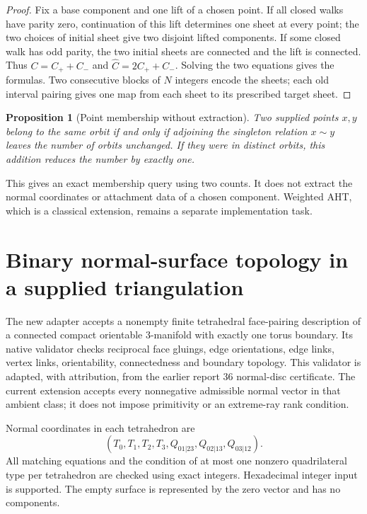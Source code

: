 \documentclass[11pt]{article}
\newtheorem{proposition}[theorem]{Proposition}
\theoremstyle{definition}
\begin{document}
\begin{proof}
Fix a base component and one lift of a chosen point. If all closed
walks have parity zero, continuation of this lift determines one sheet
at every point; the two choices of initial sheet give two disjoint lifted
components. If some closed walk has odd parity, the two initial sheets
are connected and the lift is connected. Thus
$C=C_++C_-$ and $\widehat C=2C_++C_-$. Solving the two equations gives
the formulas. Two consecutive blocks of $N$ integers encode the sheets;
each old interval pairing gives one map from each sheet to its prescribed
target sheet.
\end{proof}

\begin{proposition}[Point membership without extraction]
Two supplied points $x,y$ belong to the same orbit if and only if
adjoining the singleton relation $x\sim y$ leaves the number of orbits
unchanged. If they were in distinct orbits, this addition reduces the
number by exactly one.
\end{proposition}

This gives an exact membership query using two counts. It does not
extract the normal coordinates or attachment data of a chosen component.
Weighted AHT, which is a classical extension, remains a separate
implementation task.

\section{Binary normal-surface topology in a supplied triangulation}
\label{sec:normal}

The new adapter accepts a nonempty finite tetrahedral face-pairing
description of a connected compact orientable 3-manifold with exactly
one torus boundary. Its native validator checks reciprocal face gluings,
edge orientations, edge links, vertex links, orientability, connectedness
and boundary topology. This validator is adapted, with attribution, from
the earlier report 36 normal-disc certificate. The current extension
accepts every nonnegative admissible normal vector in that ambient class;
it does not impose primitivity or an extreme-ray rank condition.

Normal coordinates in each tetrahedron are
\[
 (T_0,T_1,T_2,T_3,Q_{01|23},Q_{02|13},Q_{03|12}).
\]
All matching equations and the condition of at most one nonzero
quadrilateral type per tetrahedron are checked using exact integers.
Hexadecimal integer input is supported. The empty surface is represented
by the zero vector and has no components.
\end{document}
